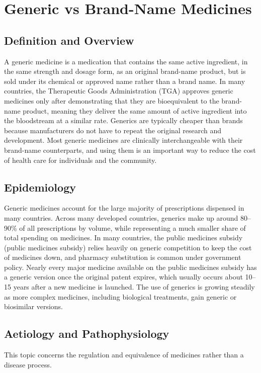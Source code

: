 \chapter{Generic vs Brand-Name Medicines}

\section*{Definition and Overview}
A generic medicine is a medication that contains the same active ingredient, in the same strength and dosage form, as an original brand-name product, but is sold under its chemical or approved name rather than a brand name. In many countries, the Therapeutic Goods Administration (TGA) approves generic medicines only after demonstrating that they are bioequivalent to the brand-name product, meaning they deliver the same amount of active ingredient into the bloodstream at a similar rate. Generics are typically cheaper than brands because manufacturers do not have to repeat the original research and development. Most generic medicines are clinically interchangeable with their brand-name counterparts, and using them is an important way to reduce the cost of health care for individuals and the community.

\section*{Epidemiology}
Generic medicines account for the large majority of prescriptions dispensed in many countries. Across many developed countries, generics make up around 80--90\% of all prescriptions by volume, while representing a much smaller share of total spending on medicines. In many countries, the public medicines subsidy (public medicines subsidy) relies heavily on generic competition to keep the cost of medicines down, and pharmacy substitution is common under government policy. Nearly every major medicine available on the public medicines subsidy has a generic version once the original patent expires, which usually occurs about 10--15 years after a new medicine is launched. The use of generics is growing steadily as more complex medicines, including biological treatments, gain generic or biosimilar versions.

\section*{Aetiology and Pathophysiology}
This topic concerns the regulation and equivalence of medicines rather than a disease process.

